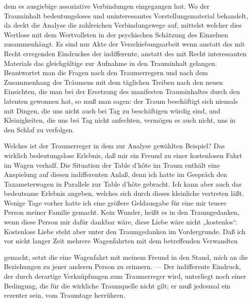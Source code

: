 \documentclass[twoside=true,titlepage=false,open=any, parskip=never, fontsize=10pt, headings=small, chapterprefix=false, appendixprefix=false]{scrbook}
\begin{document}
         
            
            
            
        \pstart
        dem es ausgiebige assoziative Verbindungen eingegangen hat. Wo der
               Trauminhalt bedeutungsloses und uninteressantes Vorstellungsmaterial
               behandelt, da deckt die Analyse die zahlreichen Verbindungswege auf,
               mittelst welcher dies Wertlose mit dem Wertvollsten in der
               psychischen Schätzung des Einzelnen zusammenhängt. Es sind nur Akte der Verschiebungsarbeit wenn anstatt des
                  mit Recht erregenden Eindruckes der indifferente, anstatt des mit Recht
                  interessanten Materials das
                  gleichgültige zur Aufnahme in den
                  Trauminhalt gelangen. Beantwortet man die Fragen nach den Traumerregern
               und nach dem Zusammenhang des Träumens mit dem täglichen Treiben
               nach den neuen Einsichten, die man bei der Ersetzung des manifesten
               Trauminhaltes durch den latenten gewonnen hat, so muß man sagen: der Traum beschäftigt sich niemals mit Dingen, die uns
                  nicht auch bei Tag zu beschäftigen würdig sind, und Kleinigkeiten, die uns bei Tag
                  nicht anfechten, vermögen es auch nicht, uns in den Schlaf zu verfolgen.
        \pend
    
            
        \pstart
        Welches ist der Traumerreger in dem zur Analyse gewählten Beispiel? Das wirklich
               bedeutungslose Erlebnis, daß mir ein Freund zu einer kostenlosen Fahrt im Wagen verhalf. Die Situation der Table d’hôte im
               Traum enthält eine Anspielung auf diesen indifferenten Anlaß, denn ich hatte im
               Gespräch den Taxameterwagen in Parallele zur Table d’hôte gebracht. Ich
               kann aber auch das bedeutsame Erlebnis angeben, welches sich durch dieses
               kleinliche vertreten läßt. Wenige Tage vorher hatte ich eine größere Geldausgabe
               für eine mir teuere Person meiner Familie gemacht. Kein Wunder, heißt es in den
               Traumgedanken, wenn diese Person mir dafür dankbar wäre, diese Liebe wäre
               nicht „kostenlos“. Kostenlose Liebe steht aber unter den Traumgedanken im Vordergrunde. Daß ich vor nicht langer Zeit mehrere Wagenfahrten mit dem betreffenden Verwandten
        \pend
    
         
            
            
            
        \pstart
        gemacht, setzt die eine Wagenfahrt mit meinem Freund in den Stand,
               mich an die Beziehungen zu jener anderen Person zu erinnern. — Der indifferente
               Eindruck, der durch derartige Verknüpfungen zum Traumerreger wird,
               unterliegt noch einer Bedingung, die für die wirkliche Traumquelle nicht gilt;
               er muß jedesmal ein rezenter sein, vom Traumtage
               herrühren.
        \pend
    
\end{document}

